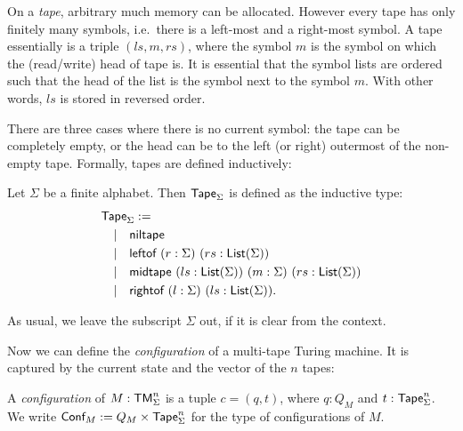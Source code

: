 On a \emph{tape}, arbitrary much memory can be allocated.  However every tape has only finitely many symbols, i.e.\ there is a left-most and a
right-most symbol.  A tape essentially is a triple $(ls,m,rs)$, where the symbol $m$ is the symbol on which the (read/write) head of tape is.  It is
essential that the symbol lists are ordered such that the head of the list is the symbol next to the symbol $m$.  With other words, $ls$ is stored in
reversed order.

There are three cases where there is no current symbol: the tape can be completely empty, or the head can be to the left (or right) outermost of the
non-empty tape.  Formally, tapes are defined inductively:

\begin{definition}[Tape]
  \label{def:tape}
  Let $\Sigma$ be a finite alphabet.  Then $\textsf{Tape}_\Sigma$ is defined as the inductive type:
  \begin{align*}
    & \textsf{Tape}_\Sigma := \\
    & \quad | \quad \textsf{niltape} \\
    & \quad | \quad \textsf{leftof}  ~ (r:\Sigma) ~ (rs:\textsf{List}(\Sigma)) \\
    & \quad | \quad \textsf{midtape} ~ (ls:\textsf{List}(\Sigma)) ~ (m:\Sigma) ~ (rs:\textsf{List}(\Sigma)) \\
    & \quad | \quad \textsf{rightof} ~ (l:\Sigma) ~ (ls:\textsf{List}(\Sigma)).
  \end{align*}
\end{definition}

As usual, we leave the subscript $\Sigma$ out, if it is clear from the context.


Now we can define the \emph{configuration} of a multi-tape Turing machine.  It is captured by the current state and the vector of the $n$ tapes:
\begin{definition}[Configuration]
  \label{def:config}
  A \emph{configuration} of $M: \textsf{TM}_\Sigma^n$ is a tuple $c = (q, t)$, where $q: Q_M$ and $t: \textsf{Tape}_\Sigma^n$.  We write
  $\textsf{Conf}_M := Q_M \times \textsf{Tape}_\Sigma^n$ for the type of configurations of $M$.
\end{definition}

